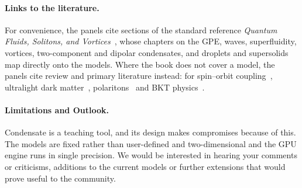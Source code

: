 \documentclass[11pt,a4paper]{article}
\begin{document}
\paragraph{Links to the literature.} For convenience, the panels cite sections of the standard reference \emph{Quantum Fluids, Solitons, and Vortices}~\cite{bbp}, whose chapters on the GPE, waves, superfluidity, vortices, two-component and dipolar condensates, and droplets and supersolids map directly onto the models. Where the book does not cover a model, the panels cite review and primary literature instead: for spin--orbit coupling~\cite{lin,galitski}, ultralight dark matter~\cite{hui2017,hui2021}, polaritons~\cite{carusottociuti} and BKT physics~\cite{berezinskii,kosterlitz,hadzibabic,simula}. 



\paragraph{Limitations and Outlook.}  Condensate is a teaching tool, and its design makes compromises because of this. The models are fixed rather than user-defined and two-dimensional and the GPU engine runs in single precision. 
We would be interested in hearing your comments or criticisms, additions to the current models or further extensions that would prove useful to the community.
\end{document}
